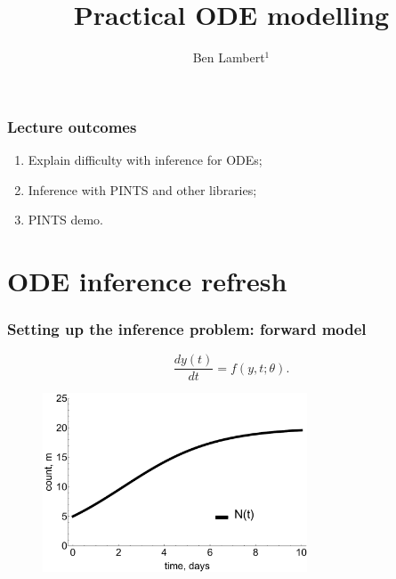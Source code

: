 \documentclass[handout]{beamer}
\title{Practical ODE modelling}
\author[Ben]{Ben Lambert$^1$}
\date{\displaydate{date}}
\institute[University of Oxford]{
	\inst{1}University of Oxford}
\begin{document}
\begin{frame}
\titlepage
\end{frame}

\begin{frame}
	\frametitle{Lecture outcomes}
	
	\begin{enumerate}
		\item Explain difficulty with inference for ODEs;
		\item Inference with PINTS and other libraries;
		\item PINTS demo.
	\end{enumerate}
	
\end{frame}

\section{ODE inference refresh}
\frame{\tableofcontents[currentsection]}

\begin{frame}
	\frametitle{Setting up the inference problem: forward model}

	
	\begin{equation}
	\frac{d y(t)}{dt} = f(y, t; \theta).
	\end{equation}
	
	\begin{figure}
		\centerline{\includegraphics[width=0.7\textwidth]{./Figures/lec7_odeSingleBulding1.pdf}}
	\end{figure}
	
\end{frame}
\end{document}
